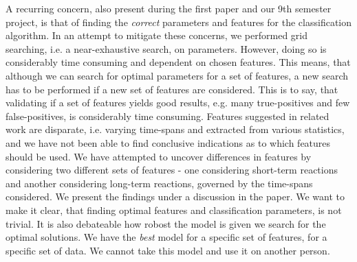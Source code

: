 A recurring concern, also present during the first paper and our 9th semester project, is that of finding the
\textit{correct} parameters and features for the classification algorithm. In an attempt to mitigate these concerns, we
performed grid searching, i.e. a near-exhaustive search, on parameters. However, doing so is considerably time consuming
and dependent on chosen features. This means, that although we can search for optimal parameters for a set of features,
a new search has to be performed if a new set of features are considered. This is to say, that validating if a set of
features yields good results, e.g. many true-positives and few false-positives, is considerably time consuming. Features
suggested in related work are disparate, i.e. varying time-spans and extracted from various statistics, and we have not
been able to find conclusive indications as to which features should be used. We have attempted to uncover differences
in features by considering two different sets of features - one considering short-term reactions and another considering
long-term reactions, governed by the time-spans considered. We present the findings under a discussion in the paper. We
want to make it clear, that finding optimal features and classification parameters, is not trivial. 
It is also debateable how robost the model is given we search for the optimal solutions. 
We have the \textit{best} model for a specific set of features, for a specific set of data. 
We cannot take this model and use it on another person. 




